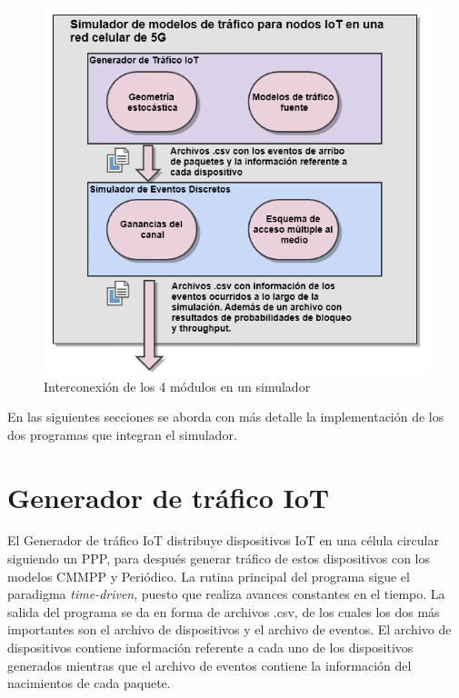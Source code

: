 \begin{figure}[th]
    \centering
    \includegraphics[scale=.74]{Figures/interconexion4modulos.png}
    \decoRule
    \caption[Interconexión de los 4 módulos en un simulador]{Interconexión de los 4 módulos en un simulador}
    \label{fig:interconexion4}
\end{figure}

En las siguientes secciones se aborda con más detalle la implementación de los dos programas que integran el simulador. \newline

\hfill

\break


\section{Generador de tráfico IoT}

    El Generador de tráfico IoT distribuye dispositivos IoT en una célula circular siguiendo un PPP, para después generar tráfico de estos dispositivos con los modelos CMMPP y Periódico. La rutina principal del programa sigue el paradigma \textit{time-driven}, puesto que realiza avances constantes en el tiempo. La salida del programa se da en forma de archivos .csv, de los cuales los dos más importantes son el archivo de dispositivos y el archivo de eventos. El archivo de dispositivos contiene información referente a cada uno de los dispositivos generados mientras que el archivo de eventos contiene la información del nacimientos de cada paquete.\newline

